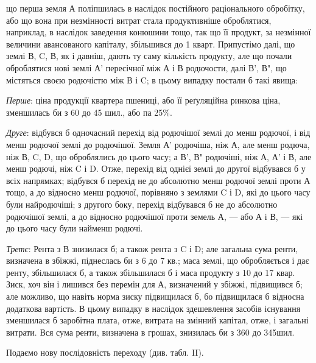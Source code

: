 \parcont{}  %
що перша земля А поліпшилась в наслідок постійного раціонального обробітку,
або що вона при незмінності витрат стала продуктивніше оброблятися,
наприклад, в наслідок заведення конюшини тощо, так що її продукт, за незмінної
величини авансованого капіталу, збільшився до 1 кварт. Припустімо
далі, що землі В, C, В, як і давніш, дають ту саму кількість продукту, але що
почали оброблятися нові землі А' пересічної між А і В родючости, далі В', В", що
містяться своєю родючістю між В і C; в цьому випадку постали б такі явища:

\emph{Перше}: ціна продукції квартера пшениці, або її реґуляційна ринкова
ціна, зменшилась би з 60 до 45 шил., або па 25\%.

\emph{Друге}: відбувся б одночасний перехід від родючішої землі до менш
родючої, і від менш родючої землі до родючішої. Земля А' родючіша, ніж А, але
менш родюча, ніж В, C, D, що оброблялись до цього часу; а В', В" родючіші, ніж
А, А' і В, але менш родючі, ніж C і D. Отже, перехід від однієї землі до другої
відбувався б у всіх напрямках; відбувся б перехід не до абсолютно
менш родючої землі проти А тощо, а до відносно менш родючої, порівняно
з землями C і D, які до цього часу були найродючіші; з другого боку, перехід
відбувався б не до абсолютно родючішої землі, а до відносно родючішої проти
земель А, — або А і В, — які до цього часу були найменш родючі.

\emph{Третє}: Рента з В знизилася б; а також рента з C і D; але загальна
сума ренти, визначена в збіжжі, піднеслась би з 6 до 7 кв.; маса землі, що
обробляється і дає ренту, збільшилася б, а також збільшилася б і маса продукту
з 10 до 17 квар. Зиск, хоч він і лишився без перемін для А, визначений у
збіжжі, підвищився б; але можливо, що навіть норма зиску підвищилася б, бо
підвищилася б відносна додаткова вартість. В цьому випадку в наслідок здешевлення
засобів існування зменшилася б заробітна плата, отже, витрата на змінний капітал,
отже, і загальні витрати. Вся сума ренти, визначена в грошах, знизилась би з 360 до 345шил.

Подаємо нову послідовність переходу
(див. табл. II).

